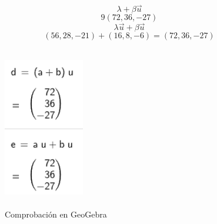 \begin{itemize}
    \[
        \lambda+\beta\vec{u}
    \]
    \[
        9(72,36,-27)
    \]
    \[
        \lambda\vec{u}+\beta\vec{u}
    \]
    \[
        (56,28,-21)+(16,8,-6)=(72,36,-27)
    \]
    \begin{figure}[ht!]
        \centering
        \includegraphics[width=100pt,height=200pt]{img/imagen9.png}
        \caption{Comprobación en GeoGebra}
    \end{figure}
\end{itemize}